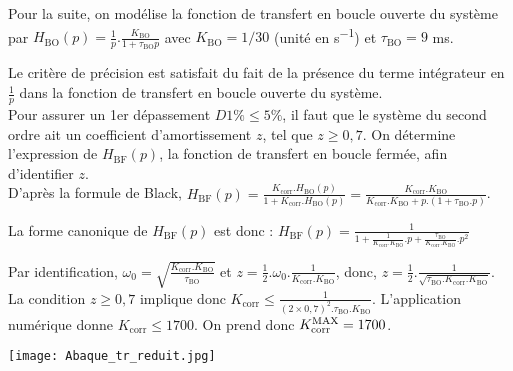 \begin{multicols}{2}
\ifprof
\else
Pour la suite, on modélise la fonction de transfert en boucle ouverte du système par \linebreak $H_{\text{BO}}(p) = \frac{1}{p}.\frac{K_{\text{BO}}}{1+\tau_{\text{BO}}p}$ avec $K_{\text{BO}} = 1/30$ (unité en \si{s^{-1}}) et $\tau_{\text{BO}} = 9$ ms.
\fi


\ifprof
\begin{corrige}
Le critère de précision est satisfait du fait de la présence du terme intégrateur en $\frac{1}{p}$ dans la fonction de transfert en boucle ouverte du système.\\
Pour assurer un 1er dépassement $D1\% \leq 5 \%$, il faut que le système du second ordre ait un coefficient d'amortissement $z$, tel que $z \ge 0,7$. On détermine l'expression de $H_{\text{BF}}(p)$, la fonction de transfert en boucle fermée, afin d'identifier $z$.\\
D'après la formule de Black, $H_{\text{BF}}(p) = \frac{K_{\text{corr}}.H_{\text{BO}}(p)}{1+K_{\text{corr}}.H_{\text{BO}}(p)} = \frac{K_{\text{corr}}.K_{\text{BO}}}{K_{\text{corr}}.K_{\text{BO}} + p.\left( 1+ \tau_{\text{BO}}.p \right)}$.

La forme canonique de $H_{\text{BF}}(p)$ est donc :
$H_{\text{BF}}(p) = \frac{1}{1+\frac{1}{K_{\text{corr}}.K_{\text{BO}}}.p+ \frac{\tau_{\text{BO}}}{K_{\text{corr}}.K_{\text{BO}}}.p^2} $

Par identification,
$\omega_0 = \sqrt{\frac{K_{\text{corr}}.K_{\text{BO}}}{\tau_{\text{BO}}}} $ et $z=\frac{1}{2}.\omega_0.\frac{1}{K_{\text{corr}}.K_{\text{BO}}}$,
donc, $z = \frac{1}{2}.\frac{1}{\sqrt{\tau_{\text{BO}}.K_{\text{corr}}.K_{\text{BO}}}}$.
La condition $z \ge 0,7$ implique donc $K_{\text{corr}} \leq \frac{1}{(2 \times 0,7)^2.\tau_{\text{BO}}.K_{\text{BO}}}$.
L'application numérique donne $K_{\text{corr}} \leq 1700$. On prend donc $K_{\text{corr}}^{\text{\text{MAX}}} = 1700$.
\end{corrige}
\fi



\ifprof
\else
\begin{center}
\texttt{[image: Abaque\_tr\_reduit.jpg]}
\end{center}
\fi


\end{multicols}
